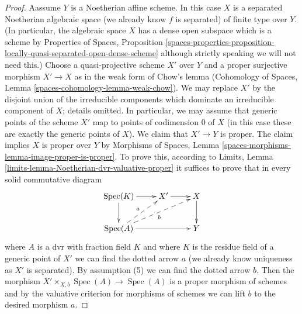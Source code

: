 \documentclass{stacks-project}
\theoremstyle{plain}
\theoremstyle{definition}
\theoremstyle{remark}
\numberwithin{equation}{subsection}
\def\Spec{\mathop{\mathrm{Spec}}}
\begin{document}
\begin{proof}
\medskip\noindent
Aassume $Y$ is a Noetherian affine scheme. In this case $X$ is a
separated Noetherian algebraic space (we already know $f$ is separated)
of finite type over $Y$. (In particular, the algebraic space $X$
has a dense open subspace which is a scheme by Properties of Spaces, Proposition
\ref{spaces-properties-proposition-locally-quasi-separated-open-dense-scheme}
although strictly speaking we will not need this.)
Choose a quasi-projective scheme $X'$ over $Y$ and a proper surjective
morphism $X' \to X$ as in the weak form of Chow's lemma
(Cohomology of Spaces, Lemma \ref{spaces-cohomology-lemma-weak-chow}).
We may replace $X'$ by the disjoint union of the irreducible components
which dominate an irreducible component of $X$; details omitted.
In particular, we may assume that generic points of the scheme $X'$ map to
points of codimension $0$ of $X$ (in this case these are exactly
the generic points of $X$). We claim that $X' \to Y$ is proper.
The claim implies $X$ is proper over $Y$ by
Morphisms of Spaces, Lemma \ref{spaces-morphisms-lemma-image-proper-is-proper}.
To prove this, according to
Limits, Lemma \ref{limits-lemma-Noetherian-dvr-valuative-proper}
it suffices to prove that in every solid commutative diagram
$$
\xymatrix{
\Spec(K) \ar[r] \ar[d] & X' \ar[r] & X \ar[d] \\
\Spec(A) \ar[rr] \ar@{-->}[ru]^a \ar@{-->}[rru]_b & & Y
}
$$
where $A$ is a dvr with fraction field $K$ and where $K$ is the residue
field of a generic point of $X'$ we can find the
dotted arrow $a$ (we already know uniqueness as $X'$ is separated).
By assumption (5) we can find the dotted arrow $b$.
Then the morphism $X' \times_{X, b} \Spec(A) \to \Spec(A)$
is a proper morphism of schemes and by the valuative criterion
for morphisms of schemes we can lift $b$ to the desired morphism $a$.
\end{proof}
\end{document}
